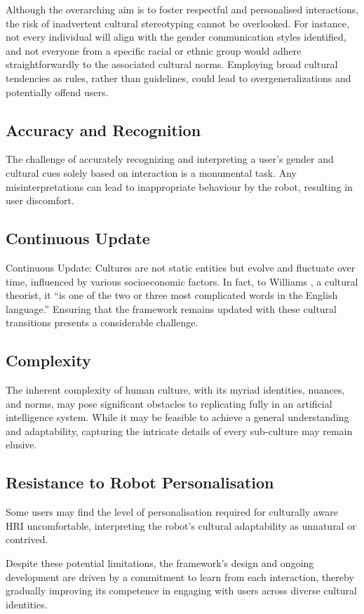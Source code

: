 Although the overarching aim is to foster respectful and personalised interactions, the risk of inadvertent cultural stereotyping cannot be overlooked. For instance, not every individual will align with the gender communication styles identified, and not everyone from a specific racial or ethnic group would adhere straightforwardly to the associated cultural norms. Employing broad cultural tendencies as rules, rather than guidelines, could lead to overgeneralizations and potentially offend users.

\subsection{Accuracy and Recognition}

The challenge of accurately recognizing and interpreting a user's gender and cultural cues solely based on interaction is a monumental task. Any misinterpretations can lead to inappropriate behaviour by the robot, resulting in user discomfort.

\subsection{Continuous Update}

Continuous Update: Cultures are not static entities but evolve and fluctuate over time, influenced by various socioeconomic factors. In fact, to Williams \cite{williams1985}, a cultural theorist, it “is one of the two or three most complicated words in the English language.” Ensuring that the framework remains updated with these cultural transitions presents a considerable challenge.

\subsection{Complexity}

The inherent complexity of human culture, with its myriad identities, nuances, and norms, may pose significant obstacles to replicating fully in an artificial intelligence system. While it may be feasible to achieve a general understanding and adaptability, capturing the intricate details of every sub-culture may remain elusive.

\subsection{Resistance to Robot Personalisation}

Some users may find the level of personalisation required for culturally aware HRI uncomfortable, interpreting the robot's cultural adaptability as unnatural or contrived.

Despite these potential limitations, the framework's design and ongoing development are driven by a commitment to learn from each interaction, thereby gradually improving its competence in engaging with users across diverse cultural identities. 